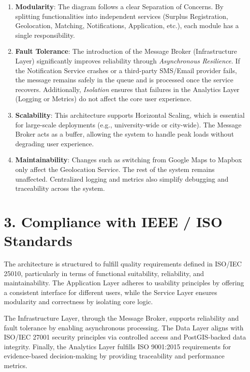 \documentclass[12pt]{article}
\begin{document}
\begin{enumerate}
    \item \textbf{Modularity}: The diagram follows a clear Separation of Concerns. By splitting functionalities into independent services (Surplus Registration, Geolocation, Matching, Notifications, Application, etc.), each module has a single responsibility.
    
    \item \textbf{Fault Tolerance}: The introduction of the Message Broker (Infrastructure Layer) significantly improves reliability through \textit{Asynchronous Resilience}. If the Notification Service crashes or a third-party SMS/Email provider fails, the message remains safely in the queue and is processed once the service recovers. Additionally, \textit{Isolation} ensures that failures in the Analytics Layer (Logging or Metrics) do not affect the core user experience.
    
    \item \textbf{Scalability}: This architecture supports Horizontal Scaling, which is essential for large-scale deployments (e.g., university-wide or city-wide). The Message Broker acts as a buffer, allowing the system to handle peak loads without degrading user experience.
    
    \item \textbf{Maintainability}: Changes such as switching from Google Maps to Mapbox only affect the Geolocation Service. The rest of the system remains unaffected. Centralized logging and metrics also simplify debugging and traceability across the system.
\end{enumerate}

\section*{3. Compliance with IEEE / ISO Standards}

The architecture is structured to fulfill quality requirements defined in ISO/IEC 25010, particularly in terms of functional suitability, reliability, and maintainability. The Application Layer adheres to usability principles by offering a consistent interface for different users, while the Service Layer ensures modularity and correctness by isolating core logic.

The Infrastructure Layer, through the Message Broker, supports reliability and fault tolerance by enabling asynchronous processing. The Data Layer aligns with ISO/IEC 27001 security principles via controlled access and PostGIS-backed data integrity. Finally, the Analytics Layer fulfills ISO 9001:2015 requirements for evidence-based decision-making by providing traceability and performance metrics.
\end{document}
